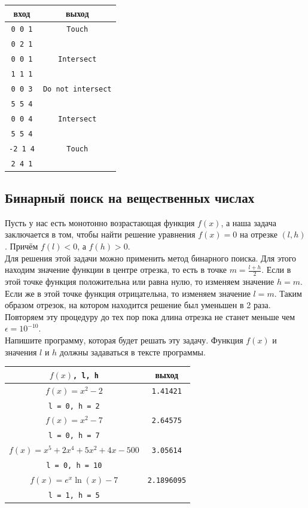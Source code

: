 \documentclass{article}
\begin{document}
\begin{center}
\begin{tabular}{ c c }
 вход & выход \\ \hline
 \texttt{0 0 1} & \texttt{Touch}  \\ 
 \texttt{0 2 1} &   \\  \hline
 \texttt{0 0 1} & \texttt{Intersect}  \\ 
 \texttt{1 1 1} &   \\  \hline
 \texttt{0 0 3} & \texttt{Do not intersect}  \\ 
 \texttt{5 5 4} &   \\  \hline
 \texttt{0 0 4} & \texttt{Intersect}  \\ 
 \texttt{5 5 4} &   \\  \hline
 \texttt{-2 1 4} & \texttt{Touch}  \\ 
 \texttt{2 4 1} &   \\
\end{tabular}
\end{center}


\subsection{Бинарный поиск на вещественных числах} 
Пусть у нас есть монотонно возрастающая функция $f(x)$, а наша задача заключается в том, чтобы найти решение уравнения $f(x) = 0$ на отрезке $(l, h)$. Причём $f(l) < 0$, а $f(h) > 0$. \\

Для решения этой задачи можно применить метод бинарного поиска. Для этого находим значение функции в центре отрезка, то есть в точке $m = \frac{l + h}{2}$. Если в этой точке функция положительна или равна нулю, то изменяем значение $h = m$. Если же в этой точке функция отрицательна, то изменяем значение $l = m$. Таким образом отрезок, на котором находится решение был уменьшен в 2 раза. Повторяем эту процедуру до тех пор пока длина отрезка не станет меньше чем $\epsilon = 10^{-10}$.\\
Напишите программу, которая будет решать эту задачу. Функция $f(x)$ и значения $l$ и $h$ должны задаваться в тексте программы.

\renewcommand{\arraystretch}{1.3}
\begin{center}
\begin{tabular}{ c | c }
 $f(x)$\texttt{, l, h} & выход \\ \hline
 $f(x) = x^2 - 2$  & \texttt{1.41421}  \\ 
 \texttt{l = 0, h = 2} &   \\ \hline
 $f(x) = x^2 - 7$  & \texttt{2.64575}  \\ 
 \texttt{l = 0, h = 7} &   \\ \hline
 $f(x) = x^5 + 2x^4 + 5x^2 +4x - 500$  & \texttt{3.05614}  \\ 
 \texttt{l = 0, h = 10} &   \\\hline
 $f(x) = e^x \ln(x) - 7$  & \texttt{2.1896095}  \\ 
 \texttt{l = 1, h = 5} &   \\
\end{tabular}
\end{center}
\renewcommand{\arraystretch}{1}
\end{document}
